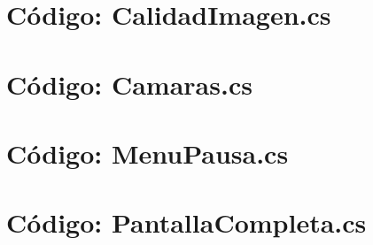 \documentclass[final,letterpaper,oneside,authoryear,11pt,singlespace,spanish]{ezthesis}
\begin{document}
\chapter{Código: CalidadImagen.cs} 
\chapter{Código: Camaras.cs} 
\chapter{Código: MenuPausa.cs} 
\chapter{Código: PantallaCompleta.cs} 
\end{document}
